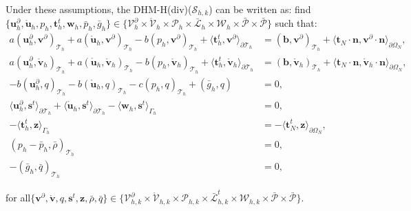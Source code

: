 \documentclass[english,11pt,3p,number,sort&compress]{elsarticle}
\begin{document}
Under these assumptions, the DHM-H(div)($\mathcal{S}_{h,k}$) can be written as: find $\{\bm{u}^\partial_h,\mathring{\bm{u}}_h,p_h,\bm{t}^t_h,\bm{w}_h,\bar{p}_h,\bar{g}_h\} \in \{\mathcal{V}^\partial_h \times \mathring{\mathcal{V}}_h \times \mathcal{P}_h \times \bar{\mathcal{L}}_h \times \mathcal{W}_h \times \bar{\mathcal{P}} \times \bar{\mathcal{P}} \}$ such that:
\begin{subequations} \label{eq:double-hybrid-six-field}
	\begin{align}
		a(\bm{u}^\partial_h,\bm{v}^\partial)_{\mathcal{T}_h} + a(\mathring{\bm{u}}_h,\bm{v}^\partial)_{\mathcal{T}_h} - b( p_h, \bm{v}^\partial)_{\mathcal{T}_h} +\langle\bm{t}^t_h,\bm{v}^\partial\rangle_{\partial\mathcal{T}_h} &= (\bm{b},\bm{v}^\partial)_{\mathcal{T}_h} + \langle\bm{t}_N\cdot\bm{n},\bm{v}^\partial\cdot\bm{n}\rangle_{\partial\Omega_N}, \label{eq:double-hybrid-six-field-a}\\
		a(\bm{u}^\partial_h,\mathring{\bm{v}}_h)_{\mathcal{T}_h} + a(\mathring{\bm{u}}_h,\mathring{\bm{v}}_h)_{\mathcal{T}_h} - b( p_h, \mathring{\bm{v}}_h)_{\mathcal{T}_h} +\langle\bm{t}^t_h,\mathring{\bm{v}}_h\rangle_{\partial\mathcal{T}_h} &= (\bm{b},\mathring{\bm{v}}_h)_{\mathcal{T}_h} + \langle\bm{t}_N\cdot\bm{n},\mathring{\bm{v}}_h\cdot\bm{n}\rangle_{\partial\Omega_N}, \label{eq:double-hybrid-six-field-b}\\ 
		-b(\bm{u}^\partial_h, q)_{\mathcal{T}_h} - b(\mathring{\bm{u}}_h, q)_{\mathcal{T}_h} - c(p_h,q)_{\mathcal{T}_h} + (\bar{g}_h,q) &= 0, \label{eq:double-hybrid-six-field-c}\\
		\langle\bm{u}^\partial_h,\bm{s}^t\rangle_{\partial\mathcal{T}_h} + \langle\mathring{\bm{u}}_h,\bm{s}^t\rangle_{\partial\mathcal{T}_h} - \langle\bm{w}_h,\bm{s}^t\rangle_{\Gamma_h} &= 0, \label{eq:double-hybrid-six-field-d}\\
		-\langle\bm{t}^t_h,\bm{z}\rangle_{\Gamma_h} &= -\langle\bm{t}_N^t,\bm{z}\rangle_{\partial\Omega_N}, \label{eq:double-hybrid-six-field-e}\\
		(p_h-\bar{p}_h,\bar{\rho})_{\mathcal{T}_h} &= 0, \label{eq:double-hybrid-six-field-f}\\
		-(\bar{g}_h,\bar{q})_{\mathcal{T}_h} &= 0, \label{eq:double-hybrid-six-field-g}
	\end{align}
\end{subequations}

\noindent for all$\{\bm{v}^\partial,\mathring{\bm{v}}, q, \bm{s}^t, \bm{z}, \bar{\rho}, \bar{q} \} \in \{\mathcal{V}^\partial_{h,k} \times \mathring{\mathcal{V}}_{h,k} \times \mathcal{P}_{h,k} \times \bar{\mathcal{L}}^t_{h,k} \times \mathcal{W
}_{h,k} \times \bar{\mathcal{P}} \times \bar{\mathcal{P}}\}$.
\end{document}
